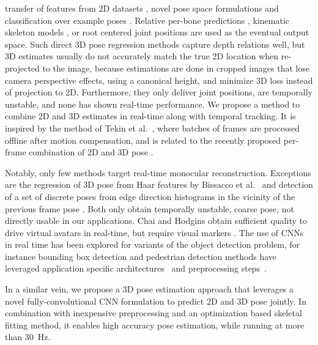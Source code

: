\documentclass[acmtog]{acmart}
\newcommand{\FPS}{30}
\begin{document}
transfer of features from 2D datasets \cite{mehta_mlc3d_arxiv16}, 
novel pose space formulations \cite{pavlakos_volumetric3d_arxiv16}
and classification over example poses \cite{pons_posebits_cvpr14,rogez_mocap_arxiv16}. 
Relative per-bone predictions \cite{li_accv14}, 
kinematic skeleton models \cite{zhou_deep_kinematic_arxiv16},
or root centered joint positions \cite{ionescu_iterated_cvpr14} are used as the eventual output space. 
Such direct 3D pose regression methods capture depth relations well, but 3D estimates usually do not accurately match the true 2D location when re-projected to the image, because estimations are done in cropped images that lose camera perspective effects, using a canonical height, and minimize 3D loss instead of projection to 2D.
Furthermore, they only deliver joint positions, are temporally unstable, and none has shown real-time performance.
We propose a method to combine 2D and 3D estimates in real-time along with temporal tracking.
It is inspired by the method of Tekin et al.~, where batches of frames are processed offline after motion compensation, and is related to the recently proposed per-frame combination of 2D and 3D pose \cite{tekin_fusion_arxiv16}.


Notably, only few methods target real-time monocular reconstruction. Exceptions are the 
 regression of 3D pose from Haar features by Bissacco et al.~ and
  detection of a set of discrete poses from edge direction histograms in the vicinity of the previous frame pose \cite{taycher2006conditional}.
 Both only obtain temporally unstable, coarse pose, not directly usable in our applications.
Chai and Hodgins obtain sufficient quality to drive virtual avatars in real-time, but require visual markers \cite{chai2005performance}.
The use of CNNs in real time has been explored for
variants of the object detection problem, for instance bounding box detection and pedestrian detection methods have leveraged application specific architectures~\cite{wei_ssd_eccv16,redmon_yolo_arxiv15,angelova_realtime_pedestrian_bmvc15} and preprocessing steps~\cite{ren_faster_rcnn_nips15}.

In a similar vein, we propose a 3D pose estimation approach that leverages a novel fully-convolutional CNN formulation to predict 2D and 3D pose jointly. In combination with inexpensive preprocessing and an optimization based skeletal fitting method, it enables high accuracy pose estimation, while running at more than \FPS~Hz.
\end{document}
